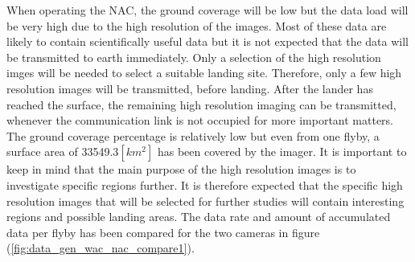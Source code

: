 When operating the NAC, the ground coverage will be low but the data load will be very high due to the high resolution of the images. Most of these data are likely to contain scientifically useful data but it is not expected that the data will be transmitted to earth immediately. Only a selection of the high resolution imges will be needed to select a suitable landing site. Therefore, only a few high resolution images will be transmitted, before landing. After the lander has reached the surface, the remaining high resolution imaging can be transmitted, whenever the communication link is not occupied for more important matters. The ground coverage percentage is relatively low but even from one flyby, a surface area of 33549.3$[km^2]$ has been covered by the imager. It is important to keep in mind that the main purpose of the high resolution images is to investigate specific regions further. It is therefore expected that the specific high resolution images that will be selected for further studies will contain interesting regions and possible landing areas. The data rate and amount of accumulated data per flyby has been compared for the two cameras in figure (\ref{fig:data_gen_wac_nac_compare1}).
